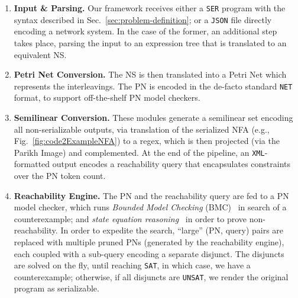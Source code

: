 \begin{enumerate}
	\item \textbf{Input \& Parsing.} 
	Our framework receives either a \texttt{SER} program with the syntax described in Sec.~\ref{sec:problem-definition}; or a \texttt{JSON} file directly encoding a network system. In the case of the former, an additional step takes place, parsing the input %
	to an expression tree that is translated to an equivalent NS.
	
	\item \textbf{Petri Net Conversion.} The NS is then translated into a Petri Net 
which represents the interleavings. 
The PN is encoded in the de-facto standard \texttt{NET} format, to support off-the-shelf PN model checkers. 
	
	\item \textbf{Semilinear Conversion.} 
These modules generate a semilinear set encoding all non-serializable outputs, via translation of the serialized NFA (e.g., Fig.~\ref{fig:code2ExampleNFA}) to a regex, which is then projected (via the Parikh Image) and complemented. 
	At the end of the pipeline, an \texttt{XML}-formatted output encodes a reachability query that encapsulates constraints over the PN token count.
	
	
	\item \textbf{Reachability Engine.} The PN and the reachability query are fed to a  PN model checker, which runs \textit{Bounded Model Checking} (BMC)~\cite{BiCiClZh99} in search of a counterexample; and \textit{state equation reasoning}~\cite{Mu77} in order to prove non-reachability. 
	In order to expedite the search, ``large'' (PN, query) pairs are replaced with multiple pruned PNs (generated by the reachability engine), each coupled with a sub-query encoding a separate disjunct. 
The disjuncts are solved on the fly, until reaching \texttt{SAT}, in which case, we have a counterexample; otherwise, if all disjuncts are \texttt{UNSAT}, we render the original program as serializable.
	

\end{enumerate}
